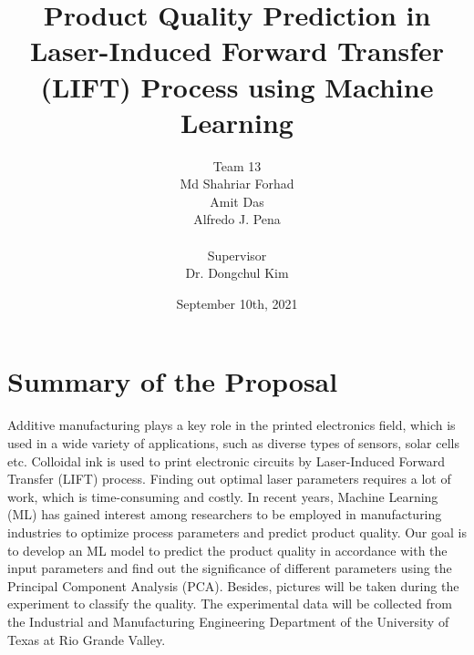 \documentclass[letterpaper]{article}
\title{Product Quality Prediction in Laser-Induced Forward Transfer (LIFT) Process using Machine Learning}
\author{Team 13 \\ Md Shahriar Forhad\\Amit Das\\Alfredo J. Pena\\ \\Supervisor\\Dr. Dongchul Kim}
\date{September 10th, 2021}
\begin{document}
\maketitle

\section*{Summary of the Proposal}
Additive manufacturing plays a key role in the printed electronics field, which is used in a wide variety of applications, such as diverse types of sensors, solar cells etc. Colloidal ink is used to print electronic circuits by Laser-Induced Forward Transfer (LIFT) process. Finding out optimal laser parameters requires a lot of work, which is time-consuming and costly. In recent years, Machine Learning (ML) has gained interest among researchers to be employed in manufacturing industries to optimize process parameters and predict product quality. Our goal is to develop an ML model to predict the product quality in accordance with the input parameters and find out the significance of different parameters using the Principal Component Analysis (PCA). Besides, pictures will be taken during the experiment to classify the quality. The experimental data will be collected from the Industrial and Manufacturing Engineering Department of the University of Texas at Rio Grande Valley.
\end{document}
